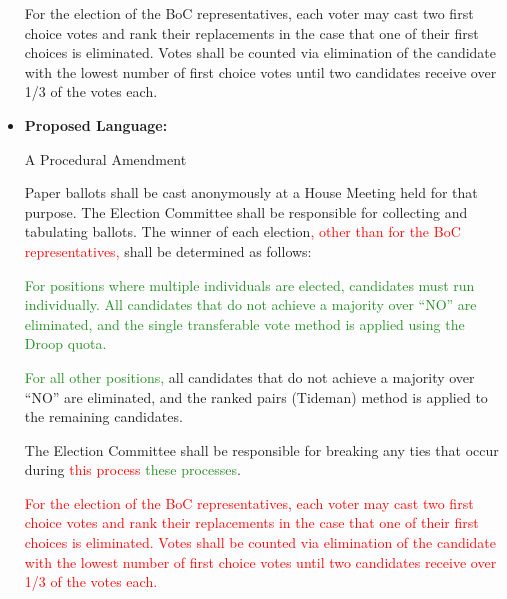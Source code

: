 \documentclass[10pt]{article} %
\newcommand{\add}[1]{\textcolor{ForestGreen}{#1}} %
\newcommand{\del}[1]{\textcolor{red}{#1}} %
\begin{document}
\begin{itemize}
    For the election of the BoC representatives, each voter may cast two first choice votes and rank their replacements in the case that one of their first choices is eliminated. Votes shall be counted via elimination of the candidate with the lowest number of first choice votes until two candidates receive over 1/3 of the votes each.
    
    \item \textbf{Proposed Language:}
    
    A Procedural Amendment
    
    Paper ballots shall be cast anonymously at a House Meeting held for that purpose. The Election Committee shall be responsible for collecting and tabulating ballots. The winner of each election\del{, other than for the BoC representatives,} shall be determined as follows:

    \setlength{\leftskip}{5mm}
    \add{For positions where multiple individuals are elected, candidates must run individually. All candidates that do not achieve a majority over ``NO'' are eliminated, and the single transferable vote method is applied using the Droop quota.}
    
    \add{For all other positions,} all candidates that do not achieve a majority over ``NO'' are eliminated, and the ranked pairs (Tideman) method is applied to the remaining candidates.
    
    \setlength{\leftskip}{0mm}
    The Election Committee shall be responsible for breaking any ties that occur during \del{this process} \add{these processes}.

    \del{For the election of the BoC representatives, each voter may cast two first choice votes and rank their replacements in the case that one of their first choices is eliminated. Votes shall be counted via elimination of the candidate with the lowest number of first choice votes until two candidates receive over 1/3 of the votes each.}
\end{itemize}
\end{document}
